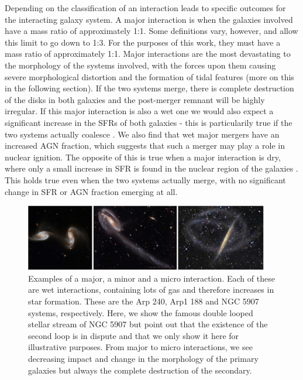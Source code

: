 Depending on the classification of an interaction leads to specific outcomes for the interacting galaxy system. A major interaction is when the galaxies involved have a mass ratio of approximately 1:1. Some definitions vary, however, and allow this limit to go down to 1:3. For the purposes of this work, they must have a mass ratio of approximately 1:1. Major interactions are the most devastating to the morphology of the systems involved, with the forces upon them causing severe morphological distortion and the formation of tidal features (more on this in the following section). If the two systems merge, there is complete destruction of the disks in both galaxies and the post-merger remnant will be highly irregular. If this major interaction is also a wet one we would also expect a significant increase in the SFRs of both galaxies - this is particularily true if the two systems actually coalesce \citep{1994ApJ...425L..13M, 1996ApJ...464..641M, 2006AJ....132..197W}. We also find that wet major mergers have an increased AGN fraction, which suggests that such a merger may play a role in nuclear ignition. The opposite of this is true when a major interaction is dry, where only a small increase in SFR is found in the nuclear region of the galaxies \citep{2006ApJ...640..241B}. This holds true even when the two systems actually merge, with no significant change in SFR or AGN fraction emerging at all.

\begin{figure}
    \centering
    \includegraphics[width=0.95\textwidth]{Introduction/figures/combined-examples-mergers.jpg}
    \caption{Examples of a major, a minor and a micro interaction. Each of these are wet interactions, containing lots of gas and therefore increases in star formation. These are the Arp 240, Arp1 188 and NGC 5907 systems, respectively. Here, we show the famous double looped stellar stream of NGC 5907 but point out that the existence of the second loop is in dispute and that we only show it here for illustrative purposes. From major to micro interactions, we see decreasing impact and change in the morphology of the primary galaxies but always the complete destruction of the secondary.}
    \label{fig:merger-clsfs}
\end{figure}

